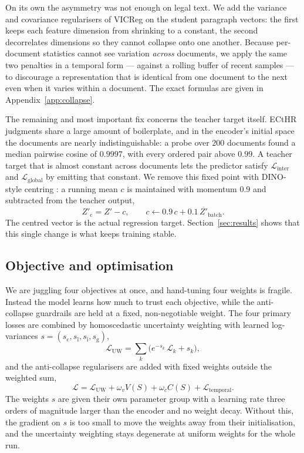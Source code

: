 \documentclass[conference]{IEEEtran}
\begin{document}
On its own the asymmetry was not enough on legal text. We add the variance and
covariance regularisers of VICReg \cite{bardes2022vicreg} on the student paragraph
vectors: the first keeps each feature dimension from shrinking to a constant, the
second decorrelates dimensions so they cannot collapse onto one another. Because
per-document statistics cannot see variation \emph{across} documents, we apply the
same two penalties in a temporal form --- against a rolling buffer of recent
samples --- to discourage a representation that is identical from one document to the
next even when it varies within a document. The exact formulas are given in
Appendix~\ref{app:collapse}.

The remaining and most important fix concerns the teacher target itself. ECtHR
judgments share a large amount of boilerplate, and in the encoder's initial space
the documents are nearly indistinguishable: a probe over $200$ documents found a
median pairwise cosine of $0.9997$, with every ordered pair above $0.99$. A teacher
target that is almost constant across documents lets the predictor satisfy
$\mathcal{L}_{\mathrm{inter}}$ and $\mathcal{L}_{\mathrm{global}}$ by emitting that
constant. We remove this fixed point with DINO-style centring
\cite{caron2021emerging}: a running mean $c$ is maintained with momentum $0.9$ and
subtracted from the teacher output,
\begin{equation}
\label{eq:center}
Z'_{\mathrm{c}} = Z' - c, \qquad
c \leftarrow 0.9\,c + 0.1\,\overline{Z'}_{\mathrm{batch}}.
\end{equation}
The centred vector is the actual regression target. Section~\ref{sec:results} shows
that this single change is what keeps training stable.

\subsection{Objective and optimisation}
We are juggling four objectives at once, and hand-tuning four weights is fragile.
Instead the model learns how much to trust each objective, while the anti-collapse
guardrails are held at a fixed, non-negotiable weight. The four primary losses are
combined by homoscedastic uncertainty weighting
\cite{kendall2018multi} with learned log-variances
$s = (s_{\mathrm{c}}, s_{\mathrm{l}}, s_{\mathrm{i}}, s_{\mathrm{g}})$,
\begin{equation}
\label{eq:uw}
\mathcal{L}_{\mathrm{UW}} = \!\!\sum_{k} \big(e^{-s_k}\,\mathcal{L}_k + s_k\big),
\end{equation}
and the anti-collapse regularisers are added with fixed weights outside the weighted
sum,
\begin{equation}
\label{eq:total}
\mathcal{L} = \mathcal{L}_{\mathrm{UW}} + \omega_v V(S) + \omega_c C(S)
+ \mathcal{L}_{\mathrm{temporal}}.
\end{equation}
The weights $s$ are given their own parameter group with a learning rate three
orders of magnitude larger than the encoder and no weight decay. Without this, the
gradient on $s$ is too small to move the weights away from their initialisation, and
the uncertainty weighting stays degenerate at uniform weights for the whole run.
\end{document}
